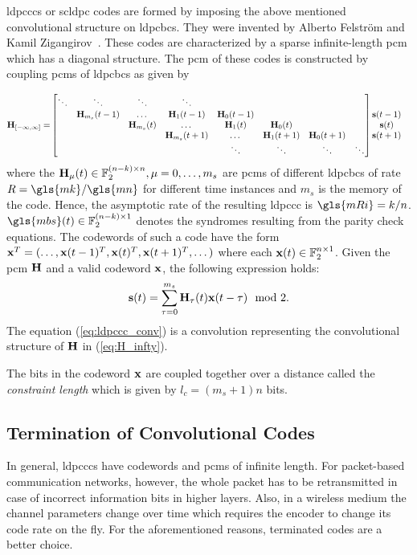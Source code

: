\glspl{ldpccc} or \gls{scldpc} codes are formed by imposing the above mentioned convolutional structure on \glspl{ldpcbc}. They were invented by Alberto Felstr{\"o}m and Kamil Zigangirov~\cite{Felstrom1999}. These codes are characterized by a sparse infinite-length \gls{pcm} which has a diagonal structure. The \gls{pcm} of these codes is constructed by coupling \glspl{pcm} of \glspl{ldpcbc} as given by

\begin{align}\label{eq:H_infty}
\mathbf{H}_{[-\infty,\infty]} =& 
\begin{bmatrix}
  \ddots &\ddots &\ddots &\ddots\\
  &\mathbf{H}_{m_s}(t-1) &\dots &\mathbf{H}_1(t-1) &\mathbf{H}_0(t-1)\\
  & &\mathbf{H}_{m_s}(t) &\dots &\mathbf{H}_1(t) &\mathbf{H}_0(t)\\
  & & &\mathbf{H}_{m_s}(t+1) &\dots &\mathbf{H}_1(t+1) &\mathbf{H}_0(t+1)\\
  & & & &\ddots &\ddots &\ddots &\ddots
  \end{bmatrix}
  \begin{matrix}
  \mathbf{s}(t-1)\\
  \mathbf{s}(t)\\
  \mathbf{s}(t+1)\\
  \end{matrix}
\end{align}
where the $\mathbf{H}_\mu(t)\in\mathbb{F}_2^{(n-k)\times n},\mu=0,\dots,m_s$ are \glspl{pcm} of different \glspl{ldpcbc} of rate $R=\gls{mk}/\gls{mn}$ for different time instances and $m_s$ is the memory of the code. Hence, the asymptotic rate of the resulting \gls{ldpccc} is $\gls{mRi}=k/n$. $\gls{mbs}(t)\in\mathbb{F}_2^{(n-k)\times 1}$ denotes the syndromes resulting from the parity check equations. The codewords of such a code have the form $\mathbf{x}^T=(\dots,\mathbf{x}(t-1)^T,\mathbf{x}(t)^T,\mathbf{x}(t+1)^T,\dots)$ where each $\mathbf{x}(t)\in\mathbb{F}_2^{n\times 1}$. Given the \gls{pcm} $\mathbf{H}$ and a valid codeword $\mathbf{x}$, the following expression holds:
\begin{align}\label{eq:ldpccc_conv}
\mathbf{s}(t)=\sum_{\tau=0}^{m_s}\mathbf{H}_\tau(t)\mathbf{x}(t-\tau)\mod 2.
\end{align}
The equation (\ref{eq:ldpccc_conv}) is a convolution representing the convolutional structure of $\mathbf{H}$ in (\ref{eq:H_infty}).

The bits in the codeword $\mathbf{x}$ are coupled together over a distance called the \emph{constraint length} which is given by $l_c=(m_s+1)n$ bits.

\subsection{Termination of Convolutional Codes}
In general, \glspl{ldpccc} have codewords and \glspl{pcm} of infinite length. For packet-based communication networks, however, the whole packet has to be retransmitted in case of incorrect information bits in higher layers. Also, in a wireless medium the channel parameters change over time which requires the encoder to change its code rate on the fly. For the aforementioned reasons, terminated codes are a better choice.


